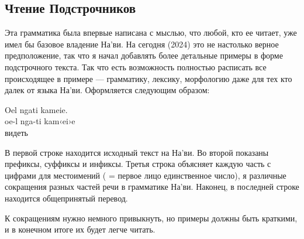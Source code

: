 \subsection{Чтение Подстрочников}
Эта грамматика была впервые написана с мыслью, что любой, кто ее читает,
уже имел бы базовое владение На'ви. На сегодня (2024) это не настолько верное предположение, так что я начал добавлять более детальные примеры в форме подстрочного текста.  Так что есть возможность полностью расписать все происходящее в примере — грамматику, лексику, морфологию даже для тех кто далек от языка На'ви. Оформляется следующим образом:

\begin{interlin}
 \glll Oel ngati kameie. \\
     oe-l nga-ti kam‹ei›e \\
       видеть \\
\end{interlin}

\noindent В первой строке находится исходный текст на На'ви.  Во второй показаны префиксы, суффиксы и инфиксы.  Третья строка объясняет каждую часть с цифрами для местоимений ( = первое лицо
единственное число), я различные сокращения разных частей речи в грамматике На'ви.  Наконец, в последней строке находится общепринятый перевод. 

К сокращениям нужно немного привыкнуть, но примеры должны быть краткими, и в конечном итоге их будет легче читать.

